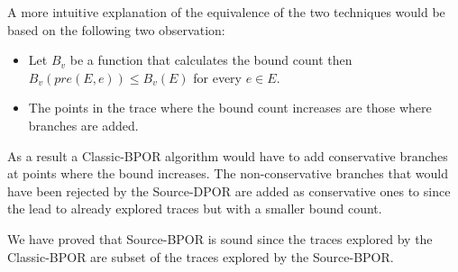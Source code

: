 A more intuitive explanation of the equivalence of the two techniques would be based on the following two observation:
\begin{itemize}
  \item Let $B_v$ be a function that calculates the bound count then $B_v(pre(E,e)) \leq B_v(E)$ for every $e \in E$.
  \item The points in the trace where the bound count increases are those where branches are added.
\end{itemize}

As a result a Classic-BPOR algorithm would have to add conservative branches at points where the bound increases. The non-conservative branches that would have been
rejected by the Source-DPOR are added as conservative ones to since the lead to already explored traces but with a smaller bound count.

We have proved that Source-BPOR is sound since the traces explored by the Classic-BPOR are subset of the traces explored by the Source-BPOR.
